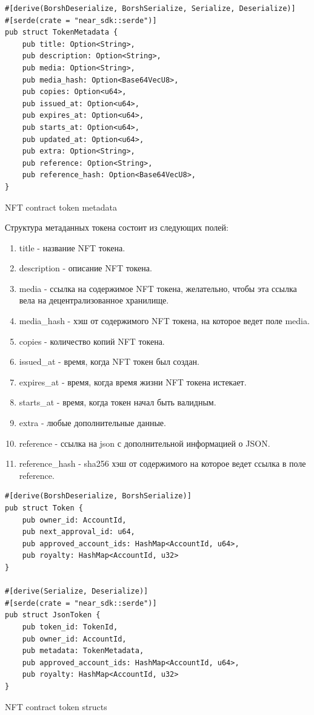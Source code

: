 \begin{listing}[H]
\begin{verbatim}
#[derive(BorshDeserialize, BorshSerialize, Serialize, Deserialize)]
#[serde(crate = "near_sdk::serde")]
pub struct TokenMetadata {
    pub title: Option<String>,
    pub description: Option<String>,
    pub media: Option<String>,
    pub media_hash: Option<Base64VecU8>,
    pub copies: Option<u64>,
    pub issued_at: Option<u64>,
    pub expires_at: Option<u64>,
    pub starts_at: Option<u64>,
    pub updated_at: Option<u64>,
    pub extra: Option<String>,
    pub reference: Option<String>,
    pub reference_hash: Option<Base64VecU8>,
}
\end{verbatim}
\caption{NFT contract token metadata}
\label{nftcontract.tokenmetadata}
\end{listing}

Структура метаданных токена состоит из следующих полей:
\begin{enumerate}

\item title - название NFT токена.
\item description - описание NFT токена.
\item media - ссылка на содержимое NFT токена, желательно, чтобы эта ссылка вела на децентрализованное хранилище.
\item media\_hash - хэш от содержимого NFT токена, на которое ведет поле media.
\item copies - количество копий NFT токена.
\item issued\_at - время, когда NFT токен был создан.
\item expires\_at - время, когда время жизни NFT токена истекает.
\item starts\_at - время, когда токен начал быть валидным.
\item extra - любые дополнительные данные.
\item reference - ссылка на json с дополнительной информацией о JSON.
\item reference\_hash - sha256 хэш от содержимого на которое ведет ссылка в поле reference.

\end{enumerate}

\begin{listing}[H]
\begin{verbatim}
#[derive(BorshDeserialize, BorshSerialize)]
pub struct Token {
    pub owner_id: AccountId,
    pub next_approval_id: u64,
    pub approved_account_ids: HashMap<AccountId, u64>,
    pub royalty: HashMap<AccountId, u32>
}

#[derive(Serialize, Deserialize)]
#[serde(crate = "near_sdk::serde")]
pub struct JsonToken {
    pub token_id: TokenId,
    pub owner_id: AccountId,
    pub metadata: TokenMetadata,
    pub approved_account_ids: HashMap<AccountId, u64>,
    pub royalty: HashMap<AccountId, u32>
}
\end{verbatim}
\caption{NFT contract token structs}
\label{nftcontract.tokenstructs}
\end{listing}

